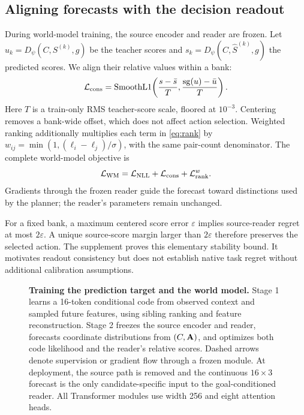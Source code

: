 \subsection{Aligning forecasts with the decision readout}
\label{sec:reader}
During world-model training, the source encoder and reader are frozen. Let $u_k=D_\psi(C,S^{(k)},g)$ be the teacher scores and $s_k=D_\psi(C,\hat S^{(k)},g)$ the predicted scores. We align their relative values within a bank:
\begin{equation}
\mathcal L_{\rm cons}=\operatorname{SmoothL1}\!\left(
\frac{s-\bar s}{T},\frac{\operatorname{sg}(u)-\bar u}{T}\right).
\label{eq:cons}
\end{equation}
Here $T$ is a train-only RMS teacher-score scale, floored at $10^{-3}$. Centering removes a bank-wide offset, which does not affect action selection. Weighted ranking additionally multiplies each term in \cref{eq:rank} by $w_{ij}=\min(1,(\ell_i-\ell_j)/\sigma)$, with the same pair-count denominator. The complete world-model objective is
\begin{equation}
\mathcal L_{\rm WM}=\mathcal L_{\rm NLL}+\mathcal L_{\rm cons}+\mathcal L_{\rm rank}^{w}.
\label{eq:pred}
\end{equation}
Gradients through the frozen reader guide the forecast toward distinctions used by the planner; the reader's parameters remain unchanged.

For a fixed bank, a maximum centered score error $\varepsilon$ implies source-reader regret at most $2\varepsilon$. A unique source-score margin larger than $2\varepsilon$ therefore preserves the selected action. The supplement proves this elementary stability bound. It motivates readout consistency but does not establish native task regret without additional calibration assumptions.

\begin{figure}[t]
\centering
\caption{\textbf{Training the prediction target and the world model.} Stage 1 learns a 16-token conditional code from observed context and sampled future features, using sibling ranking and feature reconstruction. Stage 2 freezes the source encoder and reader, forecasts coordinate distributions from $(C,\mathbf{A})$, and optimizes both code likelihood and the reader's relative scores. Dashed arrows denote supervision or gradient flow through a frozen module. At deployment, the source path is removed and the continuous $16\times3$ forecast is the only candidate-specific input to the goal-conditioned reader. All Transformer modules use width 256 and eight attention heads.}
\label{fig:architecture}
\end{figure}

